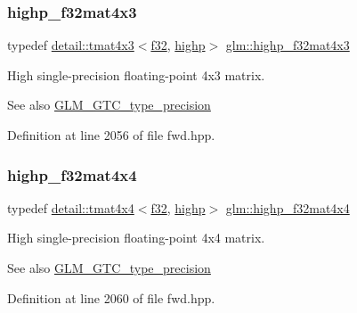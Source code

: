 \subsubsection{\texorpdfstring{highp\+\_\+f32mat4x3}{highp\_f32mat4x3}}
{\footnotesize\ttfamily typedef \hyperlink{structglm_1_1detail_1_1tmat4x3}{detail\+::tmat4x3}$<$\hyperlink{group__gtc__type__precision_ga0ec999b57f5330d9021256e96038df04}{f32}, \hyperlink{namespaceglm_a0f04f086094c747d227af4425893f545ac6f7eab42eacbb10d59a58e95e362074}{highp}$>$ \hyperlink{group__gtc__type__precision_ga5bd692575886422f501a379386e391d9}{glm\+::highp\+\_\+f32mat4x3}}

High single-\/precision floating-\/point 4x3 matrix. \begin{DoxySeeAlso}{See also}
\hyperlink{group__gtc__type__precision}{G\+L\+M\+\_\+\+G\+T\+C\+\_\+type\+\_\+precision} 
\end{DoxySeeAlso}


Definition at line 2056 of file fwd.\+hpp.

\mbox{\label{group__gtc__type__precision_gafe24f12e4f5453058caea3f583ad7d9c}} 
\subsubsection{\texorpdfstring{highp\+\_\+f32mat4x4}{highp\_f32mat4x4}}
{\footnotesize\ttfamily typedef \hyperlink{structglm_1_1detail_1_1tmat4x4}{detail\+::tmat4x4}$<$\hyperlink{group__gtc__type__precision_ga0ec999b57f5330d9021256e96038df04}{f32}, \hyperlink{namespaceglm_a0f04f086094c747d227af4425893f545ac6f7eab42eacbb10d59a58e95e362074}{highp}$>$ \hyperlink{group__gtc__type__precision_gafe24f12e4f5453058caea3f583ad7d9c}{glm\+::highp\+\_\+f32mat4x4}}

High single-\/precision floating-\/point 4x4 matrix. \begin{DoxySeeAlso}{See also}
\hyperlink{group__gtc__type__precision}{G\+L\+M\+\_\+\+G\+T\+C\+\_\+type\+\_\+precision} 
\end{DoxySeeAlso}


Definition at line 2060 of file fwd.\+hpp.

\mbox{\label{group__gtc__type__precision_ga26eef27d2efbd759e7e93c40672402e9}} 
